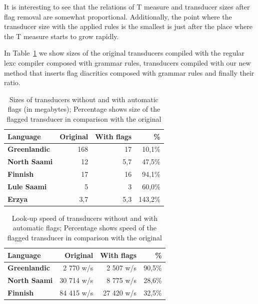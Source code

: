 \documentclass[10pt, a4paper]{article}
\begin{document}
It is interesting to see that the relations of T measure and transducer sizes after flag removal are somewhat proportional. 
Additionally, the point where the transducer size with the applied rules is the smallest is just after the place where 
the T measure starts to grow rapidly. 









In Table~\ref{table:sizes} we show sizes of the original
transducers compiled with the regular lexc compiler composed with grammar rules, transducers compiled
with our new method that inserts flag diacritics composed with grammar rules and finally their ratio.

\begin{table}
    \centering
    \begin{tabular}{|l|r|r|r|}
        \hline
        \bf Language & \bf Original & \bf With flags & \bf \% \\
        \hline\hline
        \bf Greenlandic &   168   & 17 & 10,1\%  \\
        \bf North Saami &   12     & 5,7 & 47,5\%  \\
        \bf Finnish &   17     & 16 & 94,1\%  \\
        \bf Lule Saami  &   5     & 3 & 60,0\%  \\
        \bf Erzya       &   3,7     & 5,3 & 143,2\%  \\
        \hline
    \end{tabular}
    \caption{Sizes of transducers without and with automatic flags (in megabytes); Percentage shows size of the flagged transducer in comparison with the original
    \label{table:sizes}}
\end{table}


\begin{table}[h]
 \centering
    \begin{tabular}{|l|r|r|r|}
        \hline
        \bf Language & \bf Original & \bf With flags & \bf \% \\
        \hline\hline
        \bf Greenlandic & 2 770 w/s & 2 507 w/s & 90,5\%  \\
        \bf North Saami & 30 714 w/s & 8 775 w/s & 28,6\%  \\
        \bf Finnish  & 84 415 w/s & 27 420 w/s & 32,5\%  \\

        \hline
    \end{tabular}
    \caption{Look-up speed of transducers without and with automatic flags; Percentage shows speed of the flagged transducer in comparison with the original
    \label{table:lookup}}
\end{table}
\end{document}
